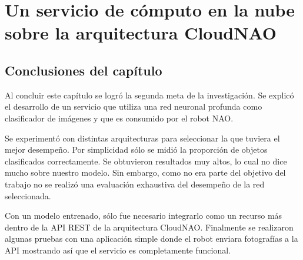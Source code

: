 \documentclass[letterpaper,12pt,spanish]{report}
\begin{document}

\chapter{Un servicio de cómputo en la nube sobre la arquitectura CloudNAO}
\label{\detokenize{chapter_three:un-servicio-de-computo-en-la-nube-sobre-la-arquitectura-cloudnao}}
\label{\detokenize{chapter_three::doc}}






\section*{Conclusiones del capítulo}
Al concluir este capítulo se logró
la segunda meta de la investigación.
Se explicó el desarrollo de un servicio que
utiliza una red neuronal profunda
como clasificador de imágenes y
que es consumido por el robot NAO.


Se experimentó con distintas
arquitecturas para seleccionar la
que tuviera el mejor desempeño. Por 
simplicidad sólo se midió la 
proporción de objetos clasificados 
correctamente. Se obtuvieron 
resultados muy altos, lo cual no
dice mucho sobre nuestro modelo. 
Sin embargo, como no era parte del objetivo
del trabajo no se realizó una evaluación
exhaustiva del desempeño de la
red seleccionada.

Con un modelo entrenado, sólo fue necesario 
integrarlo como un recurso más dentro
de la API REST de la arquitectura CloudNAO.
Finalmente se realizaron algunas pruebas
con una aplicación simple donde el robot
enviara fotografías a la API mostrando así
que el servicio es completamente funcional.














\printglossary[nonumberlist, toctitle=Glosario]
\nocite{*}



\end{document}

